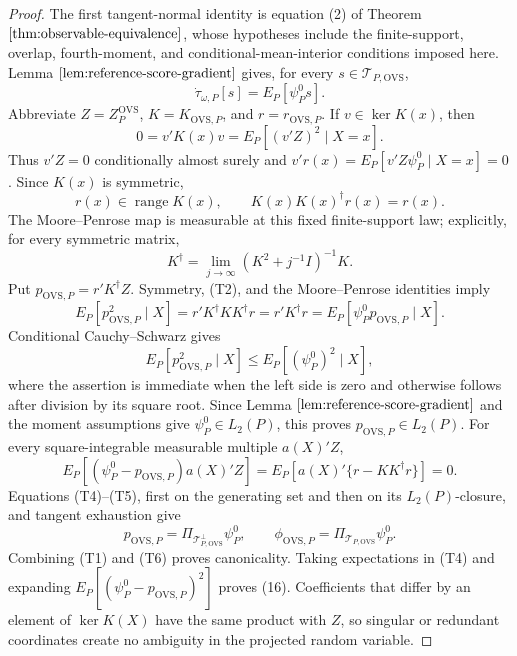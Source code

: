 \documentclass{article}
\begin{document}
\begin{proof}
The first tangent-normal identity is equation (2) of Theorem \(\ref{thm:observable-equivalence}\), whose hypotheses include the finite-support, overlap, fourth-moment, and conditional-mean-interior conditions imposed here.  Lemma \(\ref{lem:reference-score-gradient}\) gives, for every \(s\in\mathcal T_{P,\mathrm{OVS}}\),
\[
\dot\tau_{\omega,P}[s]=E_P[\psi_P^0s].
\tag{T1}
\]
Abbreviate \(Z=Z_P^{\mathrm{OVS}}\), \(K=K_{\mathrm{OVS},P}\), and \(r=r_{\mathrm{OVS},P}\).  If \(v\in\ker K(x)\), then
\[
0=v'K(x)v=E_P[(v'Z)^2\mid X=x].
\]
Thus \(v'Z=0\) conditionally almost surely and \(v'r(x)=E_P[v'Z\psi_P^0\mid X=x]=0\).  Since \(K(x)\) is symmetric,
\[
r(x)\in\operatorname{range}K(x),
\qquad K(x)K(x)^\dagger r(x)=r(x).
\tag{T2}
\]
The Moore--Penrose map is measurable at this fixed finite-support law; explicitly, for every symmetric matrix,
\[
K^\dagger=\lim_{j\to\infty}(K^2+j^{-1}I)^{-1}K.
\tag{T3}
\]
Put \(p_{\mathrm{OVS},P}=r'K^\dagger Z\).  Symmetry, (T2), and the Moore--Penrose identities imply
\[
E_P[p_{\mathrm{OVS},P}^2\mid X]
=r'K^\dagger KK^\dagger r
=r'K^\dagger r
=E_P[\psi_P^0p_{\mathrm{OVS},P}\mid X].
\tag{T4}
\]
Conditional Cauchy--Schwarz gives
\[
E_P[p_{\mathrm{OVS},P}^2\mid X]
\le E_P[(\psi_P^0)^2\mid X],
\]
where the assertion is immediate when the left side is zero and otherwise follows after division by its square root.  Since Lemma \(\ref{lem:reference-score-gradient}\) and the moment assumptions give \(\psi_P^0\in L_2(P)\), this proves \(p_{\mathrm{OVS},P}\in L_2(P)\).  For every square-integrable measurable multiple \(a(X)'Z\),
\[
E_P[(\psi_P^0-p_{\mathrm{OVS},P})a(X)'Z]
=E_P[a(X)'\{r-KK^\dagger r\}]=0.
\tag{T5}
\]
Equations (T4)--(T5), first on the generating set and then on its \(L_2(P)\)-closure, and tangent exhaustion give
\[
p_{\mathrm{OVS},P}=\Pi_{\mathcal T_{P,\mathrm{OVS}}^\perp}\psi_P^0,
\qquad
\phi_{\mathrm{OVS},P}=\Pi_{\mathcal T_{P,\mathrm{OVS}}}\psi_P^0.
\tag{T6}
\]
Combining (T1) and (T6) proves canonicality.  Taking expectations in (T4) and expanding \(E_P[(\psi_P^0-p_{\mathrm{OVS},P})^2]\) proves (16).  Coefficients that differ by an element of \(\ker K(X)\) have the same product with \(Z\), so singular or redundant coordinates create no ambiguity in the projected random variable.


\end{proof}
\end{document}
